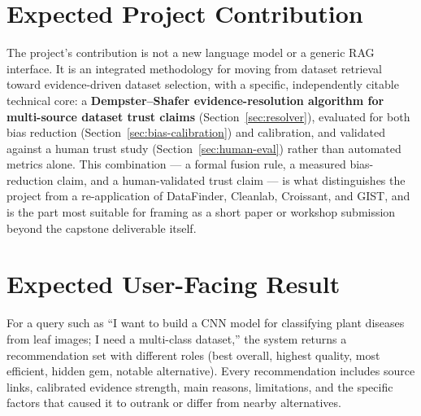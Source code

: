 \documentclass[11pt]{article}
\begin{document}
\section{Expected Project Contribution}
The project's contribution is not a new language model or a generic RAG interface. It is an integrated
methodology for moving from dataset retrieval toward evidence-driven dataset selection, with a specific,
independently citable technical core: a \textbf{Dempster--Shafer evidence-resolution algorithm for
multi-source dataset trust claims} (Section~\ref{sec:resolver}), evaluated for both bias reduction
(Section~\ref{sec:bias-calibration}) and calibration, and validated against a human trust study
(Section~\ref{sec:human-eval}) rather than automated metrics alone. This combination --- a formal fusion
rule, a measured bias-reduction claim, and a human-validated trust claim --- is what distinguishes the
project from a re-application of DataFinder, Cleanlab, Croissant, and GIST, and is the part most suitable
for framing as a short paper or workshop submission beyond the capstone deliverable itself.

\section{Expected User-Facing Result}
For a query such as ``I want to build a CNN model for classifying plant diseases from leaf images; I need
a multi-class dataset,'' the system returns a recommendation set with different roles (best overall,
highest quality, most efficient, hidden gem, notable alternative). Every recommendation includes source
links, calibrated evidence strength, main reasons, limitations, and the specific factors that caused it to
outrank or differ from nearby alternatives.

\end{document}
